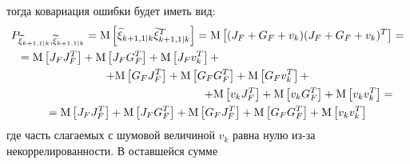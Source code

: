 тогда ковариация ошибки будет иметь вид:
\begin{multline*}
    P_{\widetilde{\xi}_{k+1,1|k}, \widetilde{\xi}_{k+1,1|k}}
        = \expectation{\widetilde{\xi}_{k+1,1|k} \widetilde{\xi}_{k+1,1|k}^T}
        = \expectation{ (J_F + G_F + v_k) ( J_F + G_F + v_k)^T } = \\
    \shoveleft{= \expectation{J_F J_F^T} + \expectation{J_F G_F^T} + \expectation{J_F v_k^T} +} \\
    + \expectation{G_F J_F^T} + \expectation{G_F G_F^T} + \expectation{G_F v_k^T} + \\
    \shoveright{+ \expectation{v_k J_F^T} + \expectation{v_k G_F^T} + \expectation{v_k v_k^T} = } \\
    = \expectation{J_F J_F^T} + \expectation{J_F G_F^T} + \expectation{G_F J_F^T} + \expectation{G_F G_F^T} + \expectation{v_k v_k^T}
\end{multline*}
где часть слагаемых с шумовой величиной $v_k$ равна нулю из-за некоррелированности. В оставшейся сумме

